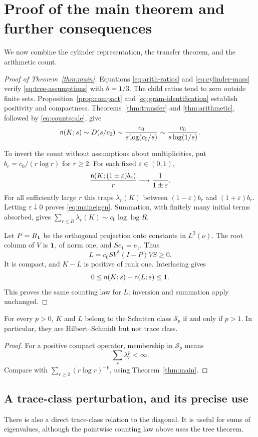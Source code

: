 \section{Proof of the main theorem and further consequences}\label{sec:consequences}
We now combine the cylinder representation, the transfer theorem, and the
arithmetic count.

\begin{proof}[Proof of Theorem~\ref{thm:main}]
Equations \eqref{eq:arith-ratios} and \eqref{eq:cylinder-mass} verify
\eqref{eq:tree-assumptions} with $\theta=1/3$. The child ratios tend to zero
outside finite sets. Proposition~\ref{prop:compact} and
\eqref{eq:gram-identification} establish positivity and compactness.
Theorems~\ref{thm:transfer} and \ref{thm:arithmetic}, followed by
\eqref{eq:countscale}, give
\[
 \mathsf n(K;s)\sim D(s/c_0)
 \sim\frac{c_0}{s\log(c_0/s)}
 \sim\frac{c_0}{s\log(1/s)}.
\]

To invert the count without assumptions about multiplicities, put
$b_r=c_0/(r\log r)$ for $r\ge2$. For each fixed $\varepsilon\in(0,1)$,
\[
 \frac{\mathsf n(K;(1\pm\varepsilon)b_r)}r
 \longrightarrow\frac1{1\pm\varepsilon}.
\]
For all sufficiently large $r$ this traps $\lambda_r(K)$ between
$(1-\varepsilon)b_r$ and $(1+\varepsilon)b_r$.
Letting $\varepsilon\downarrow0$ proves \eqref{eq:maineigen}.
Summation, with finitely many initial terms absorbed, gives
$\sum_{r\le R}\lambda_r(K)\sim c_0\log\log R$.

Let $P=R_{\mathbf 1}$ be the orthogonal projection onto constants in $L^2(\nu)$.
The root column of $V$ is $\mathbf 1$, of norm one, and $Se_1=e_1$.
Thus
\[
 L=c_0 S V^*(I-P)VS\ge0.
\]
It is compact, and $K-L$ is positive of rank one. Interlacing gives
\[
 0\le\mathsf n(K;s)-\mathsf n(L;s)\le1.
\]
This proves the same counting law for $L$; inversion and summation
apply unchanged.
\end{proof}

\begin{corollary}\label{cor:schatten}
For every $p>0$, $K$ and $L$ belong to the Schatten class $\mathcal S_p$
if and only if $p>1$. In particular, they are Hilbert--Schmidt but not
trace class.
\end{corollary}
\begin{proof}
For a positive compact operator, membership in $\mathcal S_p$ means
\[
 \sum_r\lambda_r^p<\infty.
\]
Compare with $\sum_{r\ge2}(r\log r)^{-p}$, using Theorem~\ref{thm:main}.
\end{proof}

\subsection{A trace-class perturbation, and its precise use}
There is also a direct trace-class relation to the diagonal. It is useful
for sums of eigenvalues, although the pointwise counting law above uses
the tree theorem.

